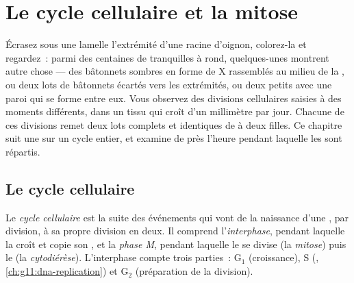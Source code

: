 \chapter{Le cycle cellulaire et la mitose}\label{ch:g11:cell-cycle-mitosis}

Écrasez sous une lamelle l'extrémité d'une racine d'oignon, colorez-la
et regardez~: parmi des centaines de  tranquilles à  rond,
quelques-unes montrent autre chose --- des bâtonnets sombres en forme
de X rassemblés au milieu de la , ou deux lots de bâtonnets
écartés vers les extrémités, ou deux petits  avec une paroi qui
se forme entre eux. Vous observez des divisions cellulaires saisies à
des moments différents, dans un tissu qui croît d'un millimètre par
jour. Chacune de ces divisions remet deux lots complets et identiques
de  à deux  filles. Ce chapitre suit une  sur
un cycle entier, et examine de près l'heure pendant laquelle les
 sont répartis.

\section{Le cycle cellulaire}

\begin{definition}\label{def:g11:cell-cycle-mitosis:cycle}
Le \emph{cycle cellulaire} est la suite des
événements qui vont de la naissance d'une , par division, à sa
propre division en deux. Il comprend l'\emph{interphase}, pendant
laquelle la  croît et copie son , et la \emph{phase M},
pendant laquelle le  se divise (la \emph{mitose})
puis le  (la \emph{cytodiérèse}). L'interphase compte trois
parties~: $\mathrm{G_1}$ (croissance), S (,
\cref{ch:g11:dna-replication}) et $\mathrm{G_2}$ (préparation de la
division).
\end{definition}

